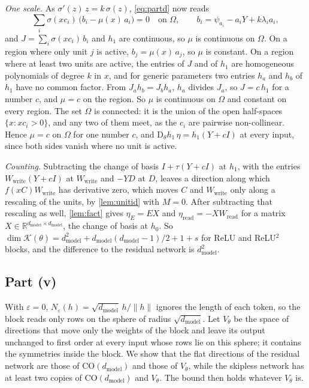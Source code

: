 \documentclass[10pt]{article}
\theoremstyle{definition}
\theoremstyle{remark}
\newcommand{\R}{\mathbb{R}}
\newcommand{\Wread}{W_{\mathrm{read}}}
\newcommand{\Wwrite}{W_{\mathrm{write}}}
\newcommand{\dm}{d_{\mathrm{model}}}
\newcommand{\CO}{\mathrm{CO}}
\newcommand{\Der}{\mathrm{D}}
\newcommand{\norm}[1]{\lVert #1\rVert}
\begin{document}
\emph{One scale.} As $\sigma'(z)\,z = k\,\sigma(z)$, \cref{eq:partd} now reads
\[
\sum_i \sigma(xc_i)\,\big(b_i - \mu(x)\,a_i\big) = 0 \quad\text{on } \Omega, \qquad b_i = \psi_{a_i} - a_iY + k\lambda_ia_i,
\]
and $J = \sum_i\sigma(xc_i)\,b_i$ and $h_1$ are continuous, so $\mu$ is continuous on $\Omega$. On a region where only unit $j$ is active, $b_j = \mu(x)\,a_j$, so $\mu$ is constant. On a region where at least two units are active, the entries of $J$ and of $h_1$ are homogeneous polynomials of degree $k$ in $x$, and for generic parameters two entries $h_a$ and $h_b$ of $h_1$ have no common factor. From $J_ah_b = J_bh_a$, $h_a$ divides $J_a$, so $J = c\,h_1$ for a number $c$, and $\mu = c$ on the region. So $\mu$ is continuous on $\Omega$ and constant on every region. The set $\Omega$ is connected: it is the union of the open half-spaces $\{x : xc_i > 0\}$, and any two of them meet, as the $c_i$ are pairwise non-collinear. Hence $\mu = c$ on $\Omega$ for one number $c$, and $\Der_\theta h_1\,\eta = h_1(Y + cI)$ at every input, since both sides vanish where no unit is active.

\emph{Counting.} Subtracting the change of basis $I + \tau(Y + cI)$ at $h_1$, with the entries $\Wwrite(Y + cI)$ at $\Wwrite$ and $-YD$ at $D$, leaves a direction along which $f(xC)\Wwrite$ has derivative zero, which moves $C$ and $\Wwrite$ only along a rescaling of the units, by \cref{lem:unitid} with $M = 0$. After subtracting that rescaling as well, \cref{lem:fact} gives $\eta_E = EX$ and $\eta_{\mathrm{read}} = -X\Wread$ for a matrix $X \in \R^{\dm\times\dm}$, the change of basis at $h_0$. So $\dim\mathcal K(\theta) = \dm^2 + \dm(\dm-1)/2 + 1 + s$ for ReLU and ReLU$^2$ blocks, and the difference to the residual network is $\dm^2$.

\subsection*{Part (v)}

With $\varepsilon = 0$, $N_\varepsilon(h) = \sqrt{\dm}\,h/\norm{h}$ ignores the length of each token, so the block reads only rows on the sphere of radius $\sqrt{\dm}$. Let $V_\theta$ be the space of directions that move only the weights of the block and leave its output unchanged to first order at every input whose rows lie on this sphere; it contains the symmetries inside the block. We show that the flat directions of the residual network are those of $\CO(\dm)$ and those of $V_\theta$, while the skipless network has at least two copies of $\CO(\dm)$ and $V_\theta$. The bound then holds whatever $V_\theta$ is.
\end{document}
